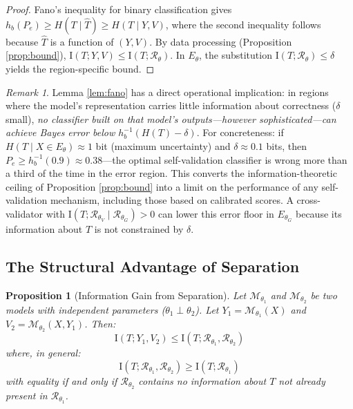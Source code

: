 \documentclass[11pt,a4paper]{article}
\newtheorem{proposition}{Proposition}[section]
\theoremstyle{remark}
\newtheorem{remark}{Remark}[section]
\newcommand{\MI}{\mathrm{I}}
\begin{document}
\begin{proof}
Fano's inequality for binary classification \cite{cover2006elements} gives $h_b(P_e) \geq H(T \mid \hat{T}) \geq H(T \mid Y, V)$, where the second inequality follows because $\hat{T}$ is a function of $(Y, V)$. By data processing (Proposition \ref{prop:bound}), $\MI(T; Y, V) \leq \MI(T; \mathcal{R}_\theta)$. In $E_\theta$, the substitution $\MI(T; \mathcal{R}_\theta) \leq \delta$ yields the region-specific bound.
\end{proof}

\begin{remark}
\label{rem:fano_operational}
Lemma \ref{lem:fano} has a direct operational implication: in regions where the model's representation carries little information about correctness ($\delta$ small), \emph{no classifier built on that model's outputs---however sophisticated---can achieve Bayes error below $h_b^{-1}(H(T) - \delta)$}. For concreteness: if $H(T \mid X \in E_\theta) \approx 1$ bit (maximum uncertainty) and $\delta \approx 0.1$ bits, then $P_e \geq h_b^{-1}(0.9) \approx 0.38$---the optimal self-validation classifier is wrong more than a third of the time in the error region. This converts the information-theoretic ceiling of Proposition \ref{prop:bound} into a limit on the performance of any self-validation mechanism, including those based on calibrated scores. A cross-validator with $\MI(T; \mathcal{R}_{\theta_V} \mid \mathcal{R}_{\theta_G}) > 0$ can lower this error floor in $E_{\theta_G}$ because its information about $T$ is not constrained by $\delta$.
\end{remark}

\subsection{The Structural Advantage of Separation}

\begin{proposition}[Information Gain from Separation]
\label{prop:separation}
Let $\mathcal{M}_{\theta_1}$ and $\mathcal{M}_{\theta_2}$ be two models with independent parameters ($\theta_1 \perp \theta_2$). Let $Y_1 = \mathcal{M}_{\theta_1}(X)$ and $V_2 = \mathcal{M}_{\theta_2}(X, Y_1)$. Then:
\begin{equation}
  \MI(T; Y_1, V_2) \leq \MI(T; \mathcal{R}_{\theta_1}, \mathcal{R}_{\theta_2})
\end{equation}
where, in general:
\begin{equation}
  \MI(T; \mathcal{R}_{\theta_1}, \mathcal{R}_{\theta_2}) \geq \MI(T; \mathcal{R}_{\theta_1})
\end{equation}
with equality if and only if $\mathcal{R}_{\theta_2}$ contains no information about $T$ not already present in $\mathcal{R}_{\theta_1}$.
\end{proposition}
\end{document}
